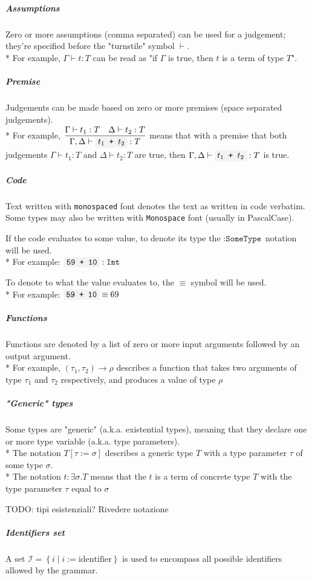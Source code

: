 \documentclass[11pt]{report}
\newcommand{\set}[1]{\left\{#1\right\}}
\newcommand{\infrule}[3][gathered]{\frac{\begin{#1}#2\end{#1}}{\begin{gathered}#3\end{gathered}}}
\newcommand{\then}{\vdash}
\newcommand{\code}[1]{\texttt{\colorbox{gray!10}{#1}}}
\newcommand{\Id}{\mathcal{I}}
\newcommand{\Int}{\texttt{Int}}
\newcommand{\Env}{\Gamma}
\theoremstyle{definition}
\newcommand{\comment}[1]{
	\parbox{0.9\linewidth}{\color{black!30}\small\sffamily #1}
}
\begin{document}
\subparagraph{Assumptions} Zero or more assumptions (comma separated) can be
used for a judgement; they're specified before the "turnstile" symbol
$\then$.\\*
For example, $\Env \then t:T$ can be read as "if $\Env$ is true, then $t$
is a term of type $T$".

\subparagraph{Premise} Judgements can be made based on zero or more premises
(space separated judgements).\\*
For example, $\infrule{\Env\then t_1:T \quad \Delta\then
t_2:T}{\Env,\Delta\then \code{$t_1$ + $t_2$}: T}$ means that with a premise
that both judgements $\Env\then t_1:T$ and $\Delta\then t_2:T$ are true,
then $\Env,\Delta\then \code{$t_1$ + $t_2$}: T$ is true.

\subparagraph{Code} Text written with \code{monospaced} font denotes the text
as written in code verbatim. Some types may also be written with
\texttt{Monospace} font (usually in PascalCase).

If the code evaluates to some value, to denote its type the
$:\texttt{SomeType}$ notation will be used.\\*
For example: $\code{59 + 10} : \Int$

To denote to what the value evaluates to, the $\equiv$ symbol will be used.\\*
For example: $\code{59 + 10} \equiv 69$

\subparagraph{Functions} Functions are denoted by a list of zero or more input
arguments followed by an output argument.\\*
For example, $(\tau_1, \tau_2) \to \rho$ describes a function that takes two
arguments of type $\tau_1$ and $\tau_2$ respectively, and produces a value of
type $\rho$

\subparagraph{"Generic" types} Some types are "generic" (a.k.a. existential
types), meaning that they declare one or more type variable (a.k.a. type
parameters).\\*
The notation $T[\tau:=\sigma]$ describes a generic type $T$ with a type
parameter $\tau$ of some type $\sigma$.\\*
The notation $t : \exists\sigma.T$ means that the $t$ is a term of concrete
type $T$ with the type parameter $\tau$ equal to $\sigma$

\comment{TODO: tipi esistenziali? Rivedere notazione}

\subparagraph{Identifiers set} A set $\Id=\set{i\mid i:=\text{identifier}}$ is
used to encompass all possible identifiers allowed by the grammar.
\end{document}
